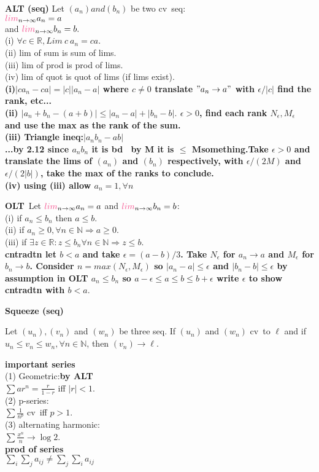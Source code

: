 \documentclass[10pt,landscape,a4paper]{article}
\def\line{

  \noindent{\color{mygray} \rule{\linewidth}{0.005mm}}

}
\def\R{\mathbb{R}}
\def\N{\mathbb{N}}
\def\cv{\textcolor{emerald}{cv}}
\def\lim{\textcolor{frenchrose}{lim}}
\newcommand\thm[1]{\line\textcolor{darklavender}{\bf#1}}
\newcommand\hint[1]{\textcolor{trolleygrey}{\bf#1}}
\newcommand\greenbox[1]{\line\textcolor{ferngreen}{\bf#1}}
\newcommand\LIMinfty{\lim_{n\to\infty}}
\begin{document}
\begin{multicols}{8}
\thm{ALT (seq)} Let $(a_n) and (b_n)$ be two \cv\ seq:\\ $\LIMinfty a_n = a$ \\and $\LIMinfty b_n = b.$ \\ 
(i) $\forall c \in \R,  Lim\ c\ a_n = ca$.\\
(ii) lim of sum is sum of lims.\\
(iii) lim  of prod is prod of lims.\\
(iv) lim of quot is quot of lims (if lims exist).
\\\hint{(i)$|c a_n - c a| = |c||a_n - a|$ where $c\neq 0$ translate $"a_n \to a"$ with $\epsilon/|c|$ find the rank, etc...  \\
(ii) $|a_n + b_n - (a+b)|\leq|a_n - a|+|b_n - b|.$ $\epsilon>0$, find each rank $N_\epsilon, M_\epsilon$ and use the max as the rank of the sum. \\
(iii) Triangle ineq:$|a_n b_n - ab|$\\...by 2.12 since $a_nb_n$ it is bd \ by M it is $\leq$ Msomething.Take $\epsilon > 0$ and translate the lims of $(a_n)$ and $(b_n)$ respectively, with $\epsilon/(2M)$ and $\epsilon/(2|b|)$, take the max of the ranks to conclude.\\
(iv) using (iii) allow $a_n = 1, \forall n$}

\thm{OLT}\ Let $\LIMinfty a_n = a$ and $\LIMinfty b_n = b $:\\
(i) if $a_n \leq b_n$ then $a \leq b$.\\
(ii)  if $a_n \geq 0, \forall n \in \N \Rightarrow a \geq 0$.\\
(iii) if $\exists z \in \R: z \leq b_n \forall n \in \N \Rightarrow z \leq b.$ 
\\\hint{cntradtn let $b < a$ and take $\epsilon = (a-b)/3$. Take $N_\epsilon$ for $a_n \to a$  and $M_\epsilon$ for $b_n \to b$. 
Consider $n = max(N_\epsilon , M_\epsilon )$ so 
$|a_n - a| \leq \epsilon$ and $|b_n - b| \leq \epsilon$
by assumption in OLT $a_n \leq b_n$ so $a-\epsilon \leq a \leq b \leq b+\epsilon$ write $\epsilon$ to show cntradtn with $b < a.$}

\thm{Squeeze (seq)} 

Let $(u_n) , (v_n)$ and $(w_n)$ be three seq. If $(u_n)$ and $(w_n)$ \cv\ to $\ell$ and if $u_n \leq v_n \leq w_n, \forall n \in \N$, then $(v_n) \to \ell$.

\tiny
\greenbox{important series}\\
(1) Geometric:\hint{by ALT}\\ $\sum a r^n = \frac{r}{1-r}$  iff $|r| < 1.$\\
(2) p-series: \\ $\sum \frac{1}{n^p}$ \cv\ iff $p > 1
.$
\\(3) alternating harmonic:\\$\sum \frac{x^n}{n} \to \log2$.\\
\hint{prod of series\\ $\sum_i \sum_j a_{ij} \neq \sum_j \sum_i a_{ij}$}


\end{multicols}
\end{document}
